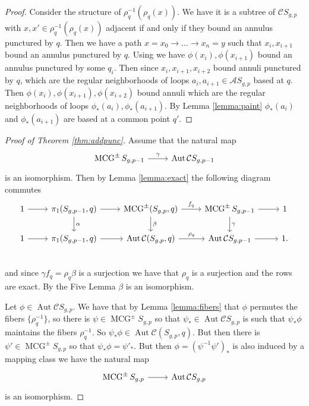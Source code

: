 \documentclass[11pt]{article}
\DeclareMathOperator{\mcg}{MCG}
\DeclareMathOperator{\aaut}{Aut}
\theoremstyle{remark}
\theoremstyle{definition}
\begin{document}
\begin{proof}
  Consider the structure of $\rho^{-1}_q(\rho_q(x))$.
  We have it is a subtree of $\mathcal C S_{g,p}$
  with $x,x' \in \rho^{-1}_q(\rho_q(x))$
  adjacent if and only if they bound an annulus punctured by $q$.
  Then we have a path $x=x_0 \to \ldots \to x_n =y$
  such that $x_i,x_{i+1}$ bound an annulus punctured by $q$.
  Using \label{lemma:annulus}
  we have $\phi(x_i),\phi(x_{i+1})$ bound an annulus
  punctured by some $q_i$.
  Then since $x_i,x_{i+1},x_{i+2}$ bound
  annuli  punctured by $q$,
  which  are the regular neighborhoods of
  loops $a_i,a_{i+1} \in \mathcal A S_{g,p}$ based at $q$.
  Then
  $\phi(x_i),\phi(x_{i+1}), \phi(x_{i+2})$
  bound annuli which are the regular neighborhoods
  of loops $\phi_\ast(a_i), \phi_\ast(a_{i+1})$.
  By Lemma \ref{lemma:paint}
  $\phi_\ast(a_i)$ and $\phi_\ast(a_{i+1})$
  are based at a common point $q'$.
\end{proof}


\begin{proof}[Proof of Theorem \ref{thm:addpunc}]
  Assume that the natural map
  $$
  \begin{tikzcd}
  \mcg^{\pm}S_{g,p-1} \arrow{r}{\gamma}& \aaut \mathcal C S_{g,p-1}
  \end{tikzcd}
  $$
  is an isomorphism.
  Then by Lemma
  \ref{lemma:exact}
  the following diagram commutes
  $$
  \begin{tikzcd}
  1 \arrow[r]&
  \pi_1(S_{g,p-1},q) \arrow[r] \arrow{d}{\alpha}&
  \mcg^{\pm}(S_{g,p},q)  \arrow{r}{f_q} \arrow{d}{\beta}&
  \mcg^{\pm}S_{g,p-1} \arrow[r] \arrow{d}{\gamma}&
  1 \\
  1 \arrow[r]&
  \pi_1(S_{g,p-1},q) \arrow{r}&
  \aaut \mathcal C (S_{g,p},q)  \arrow{r}{\rho_q}&
  \aaut \mathcal C S_{g,p-1} \arrow{r}&
  1. \\
  \end{tikzcd}
  $$
  and since $\gamma f_q = \rho_q \beta$ is a surjection we have
  that $\rho_q$ is a surjection and the rows are exact.
  By the Five Lemma $\beta$ is an isomorphism.

  Let $\phi \in \aaut \mathcal C S_{g,p}$.
  We have that by Lemma
  \ref{lemma:fibers} that
  $\phi$ permutes the fibers $\{\rho^{-1}_q\}$,
  so there is $\psi \in \mcg^{\pm}S_{g,p}$
  so that $\psi_\ast \in \aaut \mathcal C S_{g,p}$
  is such that $\psi_\ast \phi$ maintains the fibers
  $\rho^{-1}_q$.
  So $\psi_\ast \phi \in \aaut \mathcal C(S_{g,p},q)$.
  But then there is $\psi' \in \mcg^{\pm}S_{g,p}$
  so that $\psi_\ast \phi = \psi'_\ast$.
  But then $\phi = \left ( \psi^{-1}\psi' \right)_\ast$
  is also induced by a mapping class we have the natural map
  $$
  \begin{tikzcd}
  \mcg^{\pm}S_{g,p} \arrow{r} & \aaut \mathcal C S_{g,p}
  \end{tikzcd}
  $$
  is an isomorphism.
\end{proof}
\end{document}

